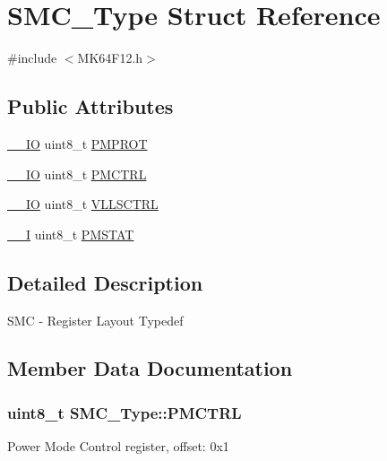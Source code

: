 \hypertarget{structSMC__Type}{}\section{S\+M\+C\+\_\+\+Type Struct Reference}
\label{structSMC__Type}


{\ttfamily \#include $<$M\+K64\+F12.\+h$>$}

\subsection*{Public Attributes}
\begin{DoxyCompactItemize}
\item 
\hyperlink{core__sc300_8h_aec43007d9998a0a0e01faede4133d6be}{\+\_\+\+\_\+\+IO} uint8\+\_\+t \hyperlink{structSMC__Type_aeb1160606f3387d12dadc263eec7b749}{P\+M\+P\+R\+OT}
\item 
\hyperlink{core__sc300_8h_aec43007d9998a0a0e01faede4133d6be}{\+\_\+\+\_\+\+IO} uint8\+\_\+t \hyperlink{structSMC__Type_ab8623b594bbc8c61e5d223101fc90d97}{P\+M\+C\+T\+RL}
\item 
\hyperlink{core__sc300_8h_aec43007d9998a0a0e01faede4133d6be}{\+\_\+\+\_\+\+IO} uint8\+\_\+t \hyperlink{structSMC__Type_ac5c2b5e99d8d45dbf2e21d8ebd2b4c9a}{V\+L\+L\+S\+C\+T\+RL}
\item 
\hyperlink{core__sc300_8h_af63697ed9952cc71e1225efe205f6cd3}{\+\_\+\+\_\+I} uint8\+\_\+t \hyperlink{structSMC__Type_af4f12c170087f5adb138c07010fc7027}{P\+M\+S\+T\+AT}
\end{DoxyCompactItemize}


\subsection{Detailed Description}
S\+MC -\/ Register Layout Typedef 

\subsection{Member Data Documentation}
\subsubsection[{\texorpdfstring{P\+M\+C\+T\+RL}{PMCTRL}}]{ uint8\+\_\+t S\+M\+C\+\_\+\+Type\+::\+P\+M\+C\+T\+RL}\hypertarget{structSMC__Type_ab8623b594bbc8c61e5d223101fc90d97}{}\label{structSMC__Type_ab8623b594bbc8c61e5d223101fc90d97}
Power Mode Control register, offset\+: 0x1 
